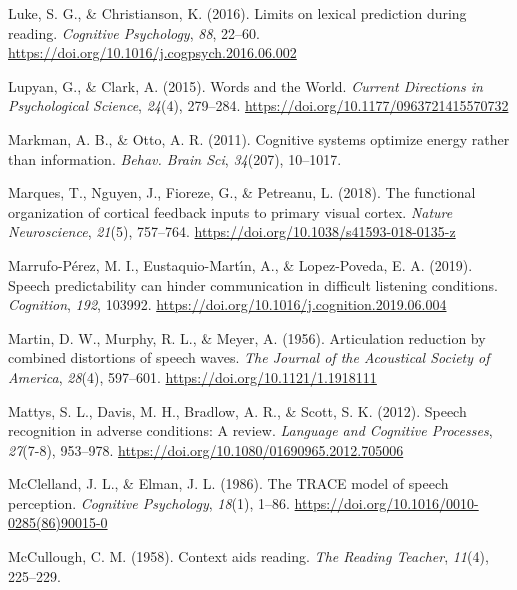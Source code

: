 \documentclass[a4paper, nobind]{templates/ociamthesis}
\newlength{\cslhangindent}
\newenvironment{CSLReferences}[2] %
 {%
  \setlength{\parindent}{0pt}
  \ifodd #1
  \let\oldpar\par
  \def\par{\hangindent=\cslhangindent\oldpar}
  \fi
  \setlength{\parskip}{1mm}
  \setlength{\baselineskip}{6mm}
 }%
 {}
\begin{document}
\begin{CSLReferences}{1}{0}
\leavevmode{}%
Luke, S. G., \& Christianson, K. (2016). Limits on lexical prediction during reading. \emph{Cognitive Psychology}, \emph{88}, 22--60. \url{https://doi.org/10.1016/j.cogpsych.2016.06.002}

\leavevmode{}%
Lupyan, G., \& Clark, A. (2015). Words and the World. \emph{Current Directions in Psychological Science}, \emph{24}(4), 279--284. \url{https://doi.org/10.1177/0963721415570732}

\leavevmode{}%
Markman, A. B., \& Otto, A. R. (2011). Cognitive systems optimize energy rather than information. \emph{Behav. Brain Sci}, \emph{34}(207), 10--1017.

\leavevmode{}%
Marques, T., Nguyen, J., Fioreze, G., \& Petreanu, L. (2018). The functional organization of cortical feedback inputs to primary visual cortex. \emph{Nature Neuroscience}, \emph{21}(5), 757--764. \url{https://doi.org/10.1038/s41593-018-0135-z}

\leavevmode{}%
Marrufo-Pérez, M. I., Eustaquio-Martı́n, A., \& Lopez-Poveda, E. A. (2019). Speech predictability can hinder communication in difficult listening conditions. \emph{Cognition}, \emph{192}, 103992. \url{https://doi.org/10.1016/j.cognition.2019.06.004}

\leavevmode{}%
Martin, D. W., Murphy, R. L., \& Meyer, A. (1956). {Articulation reduction by combined distortions of speech waves}. \emph{The Journal of the Acoustical Society of America}, \emph{28}(4), 597--601. \url{https://doi.org/10.1121/1.1918111}

\leavevmode{}%
Mattys, S. L., Davis, M. H., Bradlow, A. R., \& Scott, S. K. (2012). {Speech recognition in adverse conditions: A review}. \emph{Language and Cognitive Processes}, \emph{27}(7-8), 953--978. \url{https://doi.org/10.1080/01690965.2012.705006}

\leavevmode{}%
McClelland, J. L., \& Elman, J. L. (1986). {The TRACE model of speech perception}. \emph{Cognitive Psychology}, \emph{18}(1), 1--86. \url{https://doi.org/10.1016/0010-0285(86)90015-0}

\leavevmode{}%
McCullough, C. M. (1958). {Context aids reading}. \emph{The Reading Teacher}, \emph{11}(4), 225--229.


\end{CSLReferences}
\end{document}

